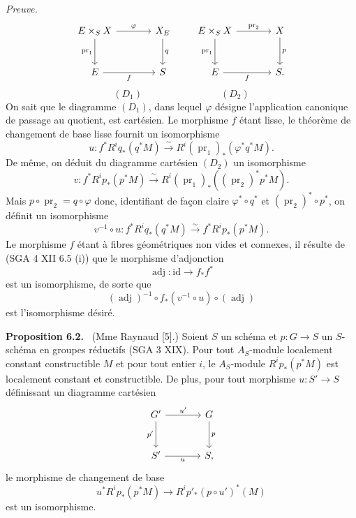 \documentclass[11pt]{article}
\newenvironment{statement}[1]{\par\medskip\noindent\textbf{#1.}\ }{\par\medskip}
\providecommand{\pr}{\operatorname{pr}}
\providecommand{\pr}{\operatorname{pr}}
\begin{document}
\emph{Preuve.}
\[
\begin{tikzcd}[column sep=large,row sep=large]
E\times_S X \arrow[r,"\varphi"] \arrow[d,"\pr_1"'] & X_E \arrow[d,"q"]\\
E \arrow[r,"f"'] & S
\end{tikzcd}
\qquad
\begin{tikzcd}[column sep=large,row sep=large]
E\times_S X \arrow[r,"\pr_2"] \arrow[d,"\pr_1"'] & X \arrow[d,"p"]\\
E \arrow[r,"f"'] & S .
\end{tikzcd}
\]
\[
(D_1)\qquad\qquad\qquad\qquad(D_2)
\]
On sait que le diagramme $(D_1)$, dans lequel $\varphi$ désigne l'application canonique de passage au quotient, est cartésien. Le morphisme $f$ étant lisse, le théorème de changement de base lisse fournit un isomorphisme
\[
u:f^*R^iq_*(q^*M)\xrightarrow{\sim}R^i(\pr_1)_*(\varphi^*q^*M).
\]
De même, on déduit du diagramme cartésien $(D_2)$ un isomorphisme
\[
v:f^*R^ip_*(p^*M)\xrightarrow{\sim}R^i(\pr_1)_*((\pr_2)^*p^*M).
\]
Mais $p\circ\pr_2=q\circ\varphi$ donc, identifiant de façon claire $\varphi^*\circ q^*$ et $(\pr_2)^*\circ p^*$, on définit un isomorphisme
\[
v^{-1}\circ u:f^*R^iq_*(q^*M)\xrightarrow{\sim} f^*R^ip_*(p^*M).
\]
Le morphisme $f$ étant à fibres géométriques non vides et connexes, il résulte de (SGA 4 XII 6.5 (i)) que le morphisme d'adjonction
\[
\operatorname{adj}:\mathrm{id}\to f_*f^*
\]
est un isomorphisme, de sorte que
\[
(\operatorname{adj})^{-1}\circ f_*(v^{-1}\circ u)\circ(\operatorname{adj})
\]
est l'isomorphisme désiré.

\begin{statement}{Proposition 6.2}
(Mme Raynaud [5].) Soient $S$ un schéma et $p:G\to S$ un $S$-schéma en groupes réductifs (SGA 3 XIX). Pour tout $A_S$-module localement constant constructible $M$ et pour tout entier $i$, le $A_S$-module $R^ip_*(p^*M)$ est localement constant et constructible. De plus, pour tout morphisme $u:S'\to S$ définissant un diagramme cartésien
\[
\begin{tikzcd}[column sep=large,row sep=large]
G' \arrow[r,"u'"] \arrow[d,"p'"'] & G \arrow[d,"p"]\\
S' \arrow[r,"u"'] & S,
\end{tikzcd}
\]
le morphisme de changement de base
\[
u^*R^ip_*(p^*M)\to R^ip'_*(p\circ u')^*(M)
\]
est un isomorphisme.
\end{statement}
\end{document}
